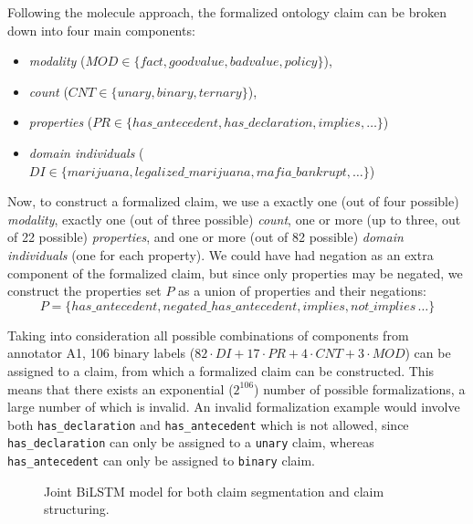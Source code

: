 Following the molecule approach, the formalized ontology claim can be broken
down into four main components:
\begin{itemize}
	\item \emph{modality} ($\mathit{MOD} \in \{\mathit{fact},
		\mathit{good value}, \mathit{bad value}, \mathit{policy}\}$), 
	\item \emph{count} ($\mathit{CNT} \in \{\mathit{unary},
		\mathit{binary},  \mathit{ternary}\}$),
	\item \emph{properties} ($\mathit{PR} \in \{\mathit{has\_antecedent},
		\mathit{has\_declaration}, \mathit{implies}, \dots\}$)
	\item \emph{domain individuals} ($\mathit{DI} \in \{\mathit{marijuana},
		\mathit{legalized\_marijuana}, \mathit{mafia\_bankrupt},
		\dots\}$)
\end{itemize}
Now, to construct a formalized claim, we use a exactly one (out of four
possible) \emph{modality}, exactly one (out of three possible) \emph{count},
one or more (up to three, out of 22 possible) \emph{properties}, and one
or more (out of 82 possible) \emph{domain individuals} (one for each property). 
We could have had negation as an extra component of the formalized claim, but
since only properties may be negated, we construct the properties set $P$ as a
union of properties and their negations: 
$$
P = \{\mathit{has\_antecedent}, 
\mathit{negated\_has\_antecedent}, \mathit{implies}, \mathit{not\_implies}\, \dots\}
$$

Taking into consideration all possible combinations of components from
annotator A1, 106 binary labels ($82 \cdot \mathit{DI} + 17 \cdot \mathit{PR} + 4\cdot
\mathit{CNT} + 3 \cdot \mathit{MOD}$) can be assigned to a claim, from which a
formalized claim can be constructed.  This means that there  exists an
exponential ($2^{106}$) number of possible formalizations, a large number of
which is invalid.  An invalid formalization example would involve both
\texttt{has\_declaration} and \texttt{has\_antecedent} which is not allowed,
since \texttt{has\_declaration} can only be assigned to a \texttt{unary} claim,
whereas \texttt{has\_antecedent} can only be assigned to \texttt{binary} claim. 

\begin{figure}
	
	\caption{Joint BiLSTM model for both claim segmentation and claim 
	structuring. }
	\label{fig:joint_model}
\end{figure}

